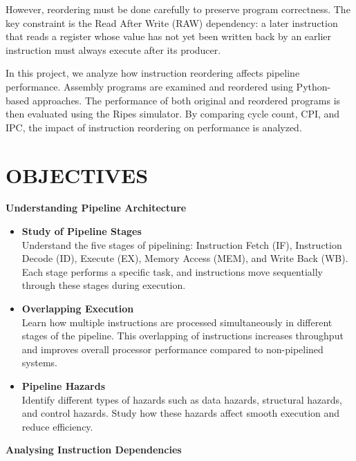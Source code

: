 \documentclass[11pt]{report}
\begin{document}
However, reordering must be done carefully to preserve program correctness. The key constraint is the Read After Write (RAW) dependency: a later instruction that reads a register whose value has not yet been written back by an earlier instruction must always execute after its producer.

In this project, we analyze how instruction reordering affects pipeline performance. Assembly programs are examined and reordered using Python-based approaches. The performance of both original and reordered programs is then evaluated using the Ripes simulator.
By comparing cycle count, CPI, and IPC, the impact of instruction reordering on performance is analyzed.

\section{OBJECTIVES}
\noindent

\textbf{Understanding Pipeline Architecture}

\begin{itemize}
\item \textbf{Study of Pipeline Stages} \\
Understand the five stages of pipelining: Instruction Fetch (IF), Instruction Decode (ID), Execute (EX), Memory Access (MEM), and Write Back (WB). Each stage performs a specific task, and instructions move sequentially through these stages during execution.

\item \textbf{Overlapping Execution} \\
Learn how multiple instructions are processed simultaneously in different stages of the pipeline. This overlapping of instructions increases throughput and improves overall processor performance compared to non-pipelined systems.

\item \textbf{Pipeline Hazards} \\
Identify different types of hazards such as data hazards, structural hazards, and control hazards. Study how these hazards affect smooth execution and reduce efficiency.
\end{itemize}

\vspace{0.7cm}

\noindent
\textbf{Analysing Instruction Dependencies}
\end{document}
